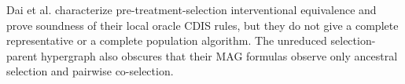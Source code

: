 Dai et al. characterize pre-treatment-selection interventional equivalence and prove soundness of their local oracle CDIS rules, but they do not give a complete representative or a complete population algorithm.  The unreduced selection-parent hypergraph also obscures that their MAG formulas observe only ancestral selection and pairwise co-selection.